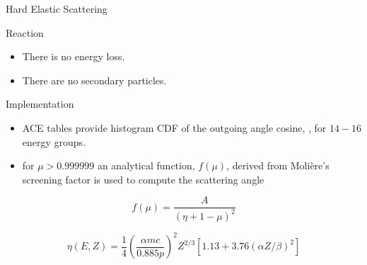 \documentclass{beamer}
\begin{document}
\begin{frame}{Hard Elastic Scattering}
  
  \begin{block}{Reaction}
    \begin{itemize}
      \item There is no energy loss.
      \item There are no secondary particles.
    \end{itemize}
  \end{block}  
      
  \begin{block}{Implementation}
    \begin{itemize}
      \item ACE tables provide histogram CDF of the outgoing angle cosine, \textmu, 
            for $14-16$ energy groups.
      \item for $\mu > 0.999999$ an analytical function, $f(\mu)$, derived from Moli\`ere's screening factor is used to compute the scattering angle
    \end{itemize}

  \begin{equation*}
    f(\mu) = \frac{A}{(\eta + 1 - \mu)^2}
  \end{equation*}

  \begin{equation*}
    \eta(E,Z) = \frac{1}{4}\left(\frac{\alpha mc}{0.885p}\right)^2 Z^{2/3}[1.13+3.76(\alpha Z/\beta)^2]
  \end{equation*}
  
    \end{block}  


\end{frame}
\end{document}

